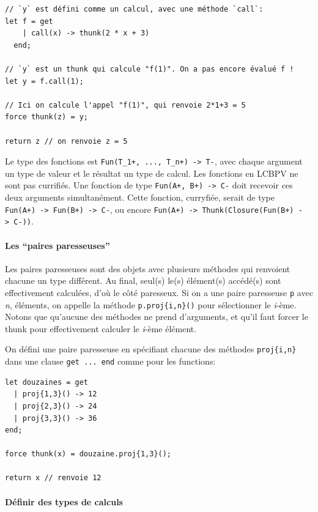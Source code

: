 \documentclass[12pt]{article}
\begin{document}
\begin{verbatim}
// `y` est défini comme un calcul, avec une méthode `call`:
let f = get 
    | call(x) -> thunk(2 * x + 3)
  end;
  
// `y` est un thunk qui calcule "f(1)". On a pas encore évalué f !
let y = f.call(1);

// Ici on calcule l'appel "f(1)", qui renvoie 2*1+3 = 5
force thunk(z) = y;

return z // on renvoie z = 5
\end{verbatim}

Le type des fonctions est
\texttt{Fun(T\_1+,\ ...,\ T\_n+)\ -\textgreater{}\ T-}, avec chaque
argument un type de valeur et le résultat un type de calcul. Les
fonctions en LCBPV ne sont pas currifiés. Une fonction de type
\texttt{Fun(A+,\ B+)\ -\textgreater{}\ C-} doit recevoir ces deux
arguments simultanément. Cette fonction, curryfiée, serait de type
\texttt{Fun(A+)\ -\textgreater{}\ Fun(B+)\ -\textgreater{}\ C-}, ou
encore
\texttt{Fun(A+)\ -\textgreater{}\ Thunk(Closure(Fun(B+)\ -\textgreater{}\ C-))}.

\hypertarget{les-paires-paresseuses}{%
      \paragraph*{Les ``paires
            paresseuses''}\label{les-paires-paresseuses}}

Les paires paresseuses sont des objets avec plusieurs méthodes qui
renvoient chacune un type différent. Au final, seul(s) le(s) élément(s)
accédé(s) sont effectivement calculées, d'où le côté paresseux. Si on a
une paire paresseuse \texttt{p} avec \emph{n}, éléments, on appelle la
méthode \texttt{p.proj\{i,n\}()} pour sélectionner le \emph{i}-ème.
Notons que qu'aucune des méthodes ne prend d'arguments, et qu'il faut
forcer le thunk pour effectivement calculer le \emph{i}-ème élément.

On défini une paire paresseuse en spécifiant chacune des méthodes
\texttt{proj\{i,n\}} dans une clause \texttt{get\ ...\ end} comme pour
les functions:

\begin{verbatim}
let douzaines = get
  | proj{1,3}() -> 12
  | proj{2,3}() -> 24
  | proj{3,3}() -> 36
end;

force thunk(x) = douzaine.proj{1,3}();

return x // renvoie 12
\end{verbatim}

\hypertarget{duxe9finir-des-types-de-calculs}{%
      \paragraph*{Définir des types de
            calculs}\label{duxe9finir-des-types-de-calculs}}
\end{document}
